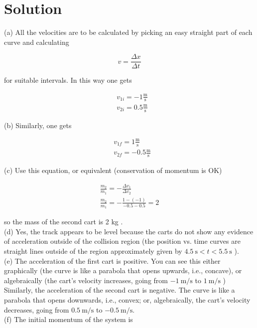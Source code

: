 \documentclass[10pt]{article}
\begin{document}
\section*{Solution}
(a) All the velocities are to be calculated by picking an easy straight part of each curve and calculating

$$
v=\frac{\Delta x}{\Delta t}
$$

for suitable intervals. In this way one gets

$$
\begin{aligned}
& v_{1 i}=-1 \frac{\mathrm{m}}{\mathrm{s}} \\
& v_{2 i}=0.5 \frac{\mathrm{m}}{\mathrm{s}}
\end{aligned}
$$

(b) Similarly, one gets

$$
\begin{aligned}
& v_{1 f}=1 \frac{\mathrm{m}}{\mathrm{s}} \\
& v_{2 f}=-0.5 \frac{\mathrm{m}}{\mathrm{s}}
\end{aligned}
$$

(c) Use this equation, or equivalent (conservation of momentum is OK)

$$
\begin{gathered}
\frac{m_{2}}{m_{1}}=-\frac{\Delta v_{1}}{\Delta v_{2}} \\
\frac{m_{2}}{m_{1}}=-\frac{1-(-1)}{-0.5-0.5}=2
\end{gathered}
$$

so the mass of the second cart is 2 kg .\\
(d) Yes, the track appears to be level because the carts do not show any evidence of acceleration outside of the collision region (the position vs. time curves are straight lines outside of the region approximately given by $4.5 \mathrm{~s}<t<5.5 \mathrm{~s}$ ).\\
(e) The acceleration of the first cart is positive. You can see this either graphically (the curve is like a parabola that opens upwards, i.e., concave), or algebraically (the cart's velocity increases, going from $-1 \mathrm{~m} / \mathrm{s}$ to $1 \mathrm{~m} / \mathrm{s}$ )\\
Similarly, the acceleration of the second cart is negative. The curve is like a parabola that opens downwards, i.e., convex; or, algebraically, the cart's velocity decreases, going from $0.5 \mathrm{~m} / \mathrm{s}$ to $-0.5 \mathrm{~m} / \mathrm{s}$.\\
(f) The initial momentum of the system is
\end{document}
